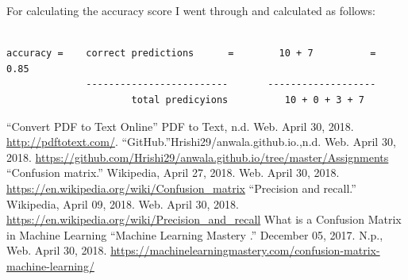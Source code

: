 \documentclass[letterpaper,11pt]{article}
\begin{document}
For calculating the accuracy score I went through \cite{accref} and calculated as follows:

\begin{verbatim}

accuracy =    correct predictions      =        10 + 7          =  0.85
              -------------------------       -------------------
                      total predicyions          10 + 0 + 3 + 7

\end{verbatim}


\clearpage



\begin{thebibliography}{9}
``Convert PDF to Text Online'' PDF to Text, n.d. Web. April 30, 2018. \url{http://pdftotext.com/}.
``GitHub.''Hrishi29/anwala.github.io.,n.d. Web. April 30, 2018. \url{https://github.com/Hrishi29/anwala.github.io/tree/master/Assignments}
``Confusion matrix.'' Wikipedia, April 27, 2018. Web. April 30, 2018. \url{https://en.wikipedia.org/wiki/Confusion_matrix}
``Precision and recall.''   Wikipedia, April 09, 2018. Web. April 30, 2018. \url{https://en.wikipedia.org/wiki/Precision_and_recall}
What is a Confusion Matrix in Machine Learning ``Machine Learning Mastery .'' December 05, 2017. N.p., Web. April 30, 2018. \url{https://machinelearningmastery.com/confusion-matrix-machine-learning/}

\end{thebibliography}
\end{document}
